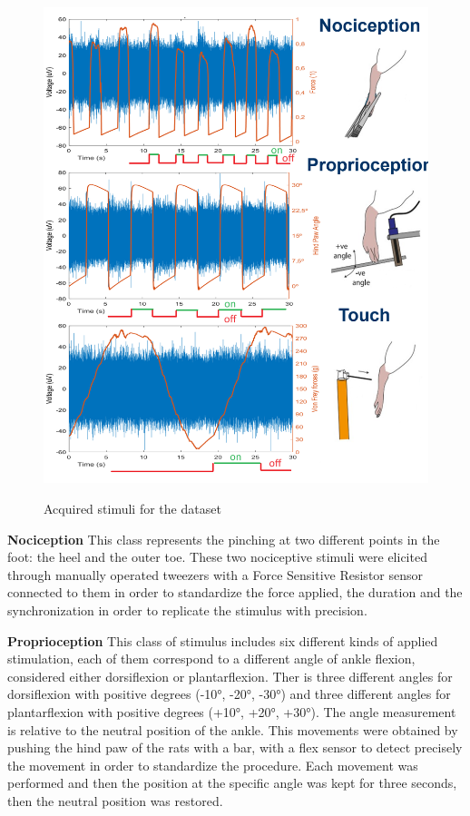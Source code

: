 \documentclass{Configuration_Files/PoliMi3i_thesis}
\begin{document}
\begin{figure}[H]
	\includegraphics[scale=0.5]{acquiredStimuli.png}
	\centering
    \label{Acquired stimuli}
    \caption{Acquired stimuli for the dataset}
	\end{figure}

\textbf{Nociception} \quad This class represents the pinching at two different points in the foot: the heel and the outer toe.
These two nociceptive stimuli were elicited through manually operated tweezers with a Force Sensitive Resistor sensor connected to them in order to standardize the force applied, the duration and the synchronization in order to replicate the stimulus with precision.

\textbf{Proprioception} \quad This class of stimulus includes six different kinds of applied stimulation, each of them correspond to a different angle of ankle flexion, considered either dorsiflexion or plantarflexion.
Ther is three different angles for dorsiflexion with positive degrees (-10°, -20°, -30°) and three different angles for plantarflexion with positive degrees (+10°, +20°, +30°).
The angle measurement is relative to the neutral position of the ankle.
This movements were obtained by pushing the hind paw of the rats with a bar, with a flex sensor to detect precisely the movement in order to standardize the procedure.
Each movement was performed and then the position at the specific angle was kept for three seconds, then the neutral position was restored.
\end{document}

